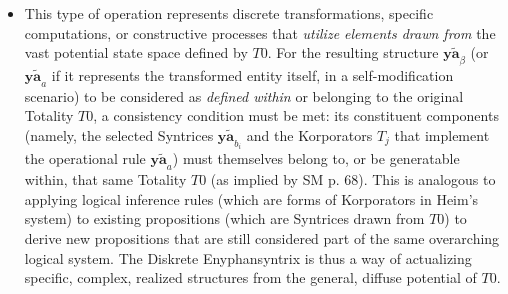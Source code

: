 \documentclass[12pt]{article}
\newcommand{\syntrixtotalitaet}{T0}
\newcommand{\diskreteEnyphansyntrix}{\bm{y\widetilde{a}}}
\begin{document}
\begin{itemize}
\begin{itemize}
        \item This type of operation represents discrete transformations, specific computations, or constructive processes that \textit{utilize elements drawn from} the vast potential state space defined by \( \syntrixtotalitaet \). For the resulting structure \( \diskreteEnyphansyntrix_\beta \) (or \( \diskreteEnyphansyntrix_a \) if it represents the transformed entity itself, in a self-modification scenario) to be considered as \textit{defined within} or belonging to the original Totality \( \syntrixtotalitaet \), a consistency condition must be met: its constituent components (namely, the selected Syntrices \( \diskreteEnyphansyntrix_{b_i} \) and the Korporators \( T_j \) that implement the operational rule \( \diskreteEnyphansyntrix_a \)) must themselves belong to, or be generatable within, that same Totality \( \syntrixtotalitaet \) (as implied by SM p. 68). This is analogous to applying logical inference rules (which are forms of Korporators in Heim's system) to existing propositions (which are Syntrices drawn from \( \syntrixtotalitaet \)) to derive new propositions that are still considered part of the same overarching logical system. The Diskrete Enyphansyntrix is thus a way of actualizing specific, complex, realized structures from the general, diffuse potential of \( \syntrixtotalitaet \).
    \end{itemize}


\end{itemize}
\end{document}
